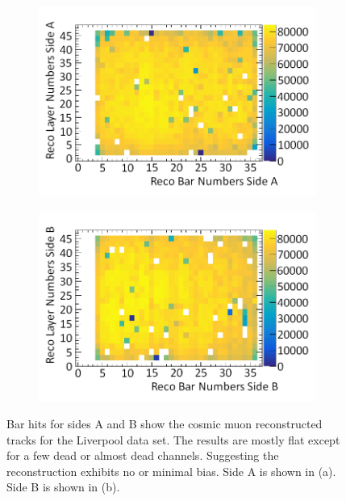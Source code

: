 \begin{figure}[!h]
\centering
\begin{subfigure}{.5\textwidth}
  \centering
  \includegraphics[width=\linewidth]{Chapter6/Figs/Raster/liverpoolSideAHitsMedText.png}
  \captionsetup{width=.9\linewidth}
  \caption{}
  \label{subFig:liverpoolSideAHits}
\end{subfigure}%
\begin{subfigure}{.5\textwidth}
  \centering
\includegraphics[width=\linewidth]{Chapter6/Figs/Raster/liverpoolSideBHitsMedText.png}
  \captionsetup{width=.9\linewidth}
  \caption{}
  \label{subFig:liverpoolSideBHits}
\end{subfigure}
\caption[Bar hits for sides A and B show the cosmic muon reconstructed tracks for the Liverpool data set.]{Bar hits for sides A and B show the cosmic muon reconstructed tracks for the Liverpool data set. The results are mostly flat except for a few dead or almost dead channels. Suggesting the reconstruction exhibits no or minimal bias. Side A is shown in (a). Side B is shown in (b).}
\label{fig:liverpoolSideABHits}
\end{figure}

